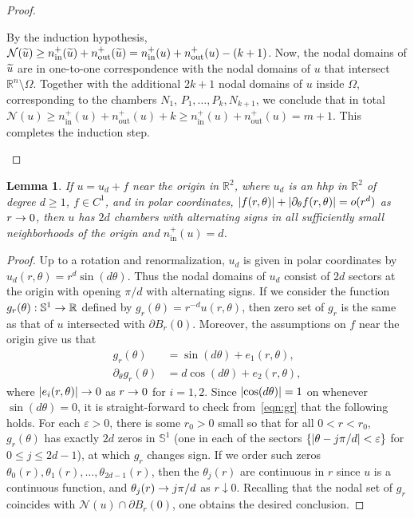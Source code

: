 \documentclass[10pt]{amsart}
\newtheorem{lemm}[theo]{Lemma}\newtheorem{prop}[theo]{Proposition}\newtheorem{coro}[theo]{Corollary}\newtheorem{conj}[theo]{Conjecture}
\theoremstyle{definition}\newtheorem{defi}[theo]{Definition}\newtheorem{rema}[theo]{Remark}\newtheorem{exam}[theo]{Example}\newtheorem{exem}[theo]{Example}\newtheorem{nota}[theo]{Notation}
\newcommand{\R}{\mathbb{R}}
\newcommand{\sphere}{\mathbb{S}}
\newcommand{\ra}{\to}
\newcommand{\da}{\downarrow}
\newcommand{\abs}[1]{\left \lvert #1 \right \rvert}
\newcommand{\nin}{n^+_{\mathrm{in}}}
\newcommand{\nout}{n^+_{\mathrm{out}}}
\newcommand{\nodal}{\mathcal{N}}
\renewcommand{\epsilon}{\varepsilon}
\let\oldtilde\tilde
\renewcommand*{\tilde}[1]{\mathchoice{\widetilde{#1}}{\widetilde{#1}}{\oldtilde{#1}}{\oldtilde{#1}}}
\renewcommand*{\to}{\mathchoice{\longrightarrow}{\rightarrow}{\rightarrow}{\rightarrow}}
\let\originalleft\left
\let\originalright\right
\renewcommand{\left}{\mathopen{}\mathclose\bgroup\originalleft}
\renewcommand{\right}{\aftergroup\egroup\originalright}
\begin{document}
\begin{proof}
\begin{itemize}
By the induction hypothesis, $\nodal(\tilde u)\geq \nin(\tilde u)+\nout(\tilde u)=\nin(u)+\nout(u)-(k+1)$. Now, the nodal domains of $\tilde u$ are in one-to-one correspondence with the nodal domains of $u$ that intersect $\R^n\setminus\Omega$. Together with the additional $2k+1$ nodal domains of $u$ inside $\Omega$, corresponding to the chambers $N_1$, \linebreak$P_1, \dots, P_k, N_{k+1}$, we conclude that in total $\nodal(u)\geq \nin(u)+\nout(u)+k\geq \nin(u)+\nout(u)=m+1$. This completes the induction step.\qedhere
\end{itemize}
\end{proof}

\begin{lemm}\label{l:alternate}
If $u=u_d+f$ near the origin in $\R^2$, where $u_d$ is an hhp in $\R^2$ of degree $d\geq 1$, $f\in C^1$, and in polar coordinates, $|f(r,\theta)| + \abs{\partial_\theta f(r,\theta)} =o(r^d)$ as $r \ra 0$, then $u$ has $2d$ chambers with alternating signs in all sufficiently small neighborhoods of the origin and $\nin(u)=d$.
\end{lemm}

\begin{proof}
Up to a rotation and renormalization, $u_d$ is given in polar coordinates by $u_d(r,\theta) = r^d \sin (d\theta)$. Thus the nodal domains of $u_d$ consist of $2d$ sectors at the origin with opening $\pi/d$ with alternating signs. If we consider the function $g_r(\theta): \sphere^1 \ra \R$ defined by $g_r(\theta) = r^{-d} u(r,\theta)$, then zero set of $g_r$ is the same as that of $u$ intersected with $\partial B_r(0)$. Moreover, the assumptions on $f$ near the origin give us that
\begin{equation}\label{eqn:gr}
\begin{split}
g_r(\theta) &= \sin(d\theta) + e_1(r,\theta), \\
\partial_\theta g_r(\theta) &= d \cos(d\theta) + e_2(r,\theta),
\end{split}
\end{equation}
where $\abs{e_i (r,\theta)} \ra 0$ as $r \ra 0$ for $i=1,2$. Since $\abs{\cos(d\theta)} =1$ on whenever $\sin(d\theta)=0$, it is straight-forward to check from~\eqref{eqn:gr} that the following holds. For each $\epsilon >0$, there is some $r_0 >0$ small so that for all $0 < r < r_0$, $g_r(\theta)$ has exactly $2d$ zeros in $\sphere^1$ (one in each of the sectors $\{\abs{\theta - j\pi/d} < \epsilon\}$ for $0 \le j \le 2d-1$), at which $g_r$ changes sign. If we order such zeros $\theta_0(r), \theta_1(r), \dots, \theta_{2d-1}(r)$, then the $\theta_j(r)$ are continuous in $r$ since $u$ is a continuous function, and $\theta_j(r) \ra j\pi/d$ as $r \da 0$. Recalling that the nodal set of $g_r$ coincides with $\nodal(u) \cap \partial B_r(0)$, one obtains the desired conclusion.
\end{proof}
\end{document}
